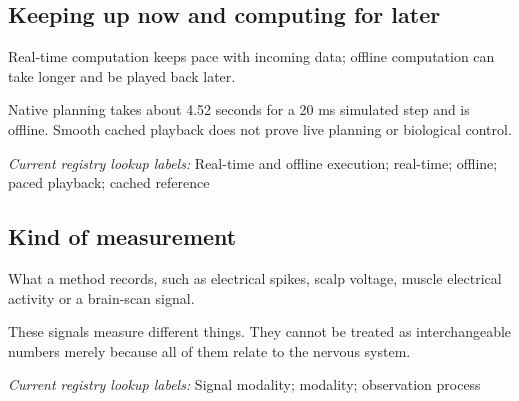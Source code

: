 \begin{samepage}
\subsection*{Keeping up now and computing for later}
\noindent Real-time computation keeps pace with incoming data; offline computation can take longer and be played back later.\par
\end{samepage}
\begin{samepage}
\noindent Native planning takes about 4.52 seconds for a 20 ms simulated step and is offline. Smooth cached playback does not prove live planning or biological control.\par\nopagebreak[4]

\end{samepage}


\noindent\textit{Current registry lookup labels:} Real-time and offline execution; real-time; offline; paced playback; cached reference\par

\begin{samepage}
\subsection*{Kind of measurement}
\noindent What a method records, such as electrical spikes, scalp voltage, muscle electrical activity or a brain-scan signal.\par
\end{samepage}
\begin{samepage}
\noindent These signals measure different things. They cannot be treated as interchangeable numbers merely because all of them relate to the nervous system.\par\nopagebreak[4]

\end{samepage}


\noindent\textit{Current registry lookup labels:} Signal modality; modality; observation process\par

